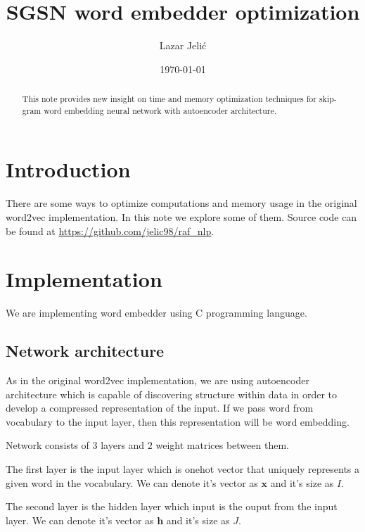 \documentclass{article}
\title{SGSN word embedder optimization}
\author{Lazar Jelić}
\date{\today}
\begin{document}
\maketitle

\begin{abstract}

This note provides new insight on time and memory optimization techniques for
skip-gram word embedding neural network with autoencoder architecture.

\end{abstract}

\section{Introduction}

There are some ways to optimize computations and memory usage in the
original word2vec implementation. In this note we explore some of them. Source
code can be found at \url{https://github.com/jelic98/raf_nlp}.

\section{Implementation}

We are implementing word embedder using C programming language.

\subsection{Network architecture}

As in the original word2vec implementation, we are using autoencoder
architecture which is capable of discovering structure within data in order
to develop a compressed representation of the input. If we pass word from
vocabulary to the input layer, then this representation will be word embedding.

\medbreak

Network consists of $3$ layers and $2$ weight matrices between them.

The first layer is the input layer which is onehot vector that uniquely represents a given word in the vocabulary.
We can denote it's vector as $\boldsymbol{x}$ and it's size as $I$.

\medbreak

The second layer is the hidden layer which input is the ouput from the input
layer.
We can denote it's vector as $\boldsymbol{h}$ and it's size as $J$.
\end{document}
